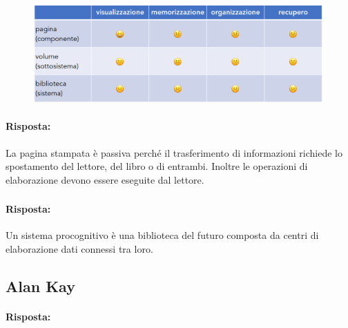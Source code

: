 
\begin{figure}[h]
    \centering
    \includegraphics[scale=0.20]{images/Schemi.png}
\end{figure}


\paragraph{Risposta:} La pagina stampata è passiva perché il trasferimento di informazioni richiede lo spostamento del 
lettore, del libro o di entrambi. Inoltre le operazioni di elaborazione devono essere eseguite dal lettore.

\subsubsection{}


\paragraph{Risposta:} Un sistema procognitivo è una biblioteca del futuro composta da centri di elaborazione dati
connessi tra loro.

\subsection{Alan Kay}


\paragraph{Risposta:} 

